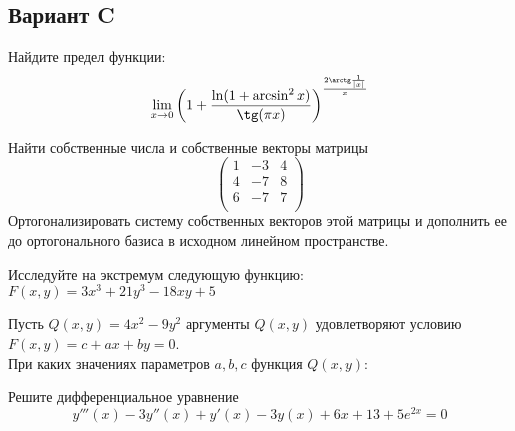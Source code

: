 \documentclass[addpoints, answers]{exam} %
\begin{document}
\subsection{Вариант C}
\begin{questions}

\question Найдите предел функции: 
\[\lim_{x\to0}\left( 1+\frac{\ln(1+\arcsin^2x) }{\tg(\pi x) }\right)^{\frac{2\arctg\frac{1}{|x|}}{x}}
\]

\question Найти собственные числа и собственные векторы матрицы
\[\left( \begin{array}{ccc}
1 & -3 & 4\\
4 & -7 & 8 \\
 6 & -7 & 7 \\
\end{array}\right)
\]
Ортогонализировать систему собственных векторов этой матрицы и дополнить ее до ортогонального базиса в исходном линейном пространстве.
 
\question	Исследуйте на экстремум следующую функцию: $F(x,y)=3x^3+21y^3-18xy+5$

\question Пусть $Q(x,y)=4x^2-9y^2$ аргументы $Q(x,y)$ удовлетворяют условию$F(x,y)=c+ax+by=0$.\\
При каких значениях параметров $a,b,c$ функция $Q(x,y)$:


\question	Решите дифференциальное уравнение
\[
y'''(x)-3y''(x)+y'(x)-3y(x)+6x+13+5e^{2x}=0
\]
 


\end{questions}
\end{document}
